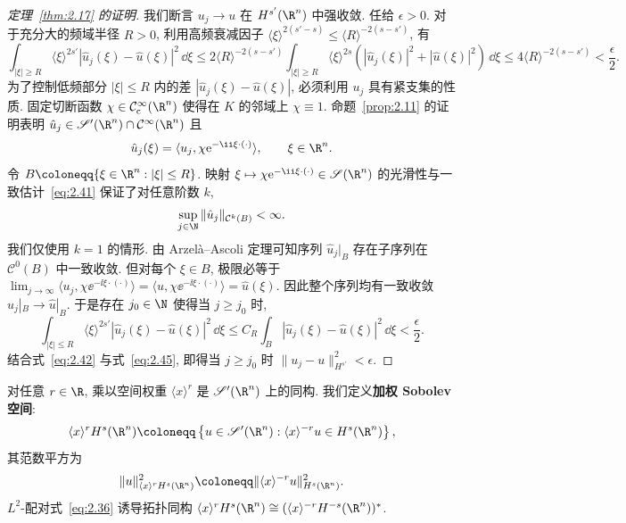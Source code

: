 \begin{proof}[定理~\ref{thm:2.17} 的证明]
我们断言 $u_j \to u$ 在 $H^{s'}(\R^n)$ 中强收敛. 任给 $\epsilon > 0$. 对于充分大的频域半径 $R > 0$, 利用高频衰减因子 $\langle \xi \rangle^{2(s'-s)} \le \langle R \rangle^{-2(s-s')}$, 有
\begin{equation}\label{eq:2.42}
    \int_{|\xi| \ge R} \langle \xi \rangle^{2s'} |\hat{u}_j(\xi) - \hat{u}(\xi)|^2 \,\dd\xi \le 2 \langle R \rangle^{-2(s-s')} \int_{|\xi| \ge R} \langle \xi \rangle^{2s} \left( |\hat{u}_j(\xi)|^2 + |\hat{u}(\xi)|^2 \right) \,\dd\xi \le 4 \langle R \rangle^{-2(s-s')} < \frac{\epsilon}{2}.
\end{equation}
为了控制低频部分 $|\xi| \le R$ 内的差 $|\hat{u}_j(\xi) - \hat{u}(\xi)|$, 必须利用 $u_j$ 具有紧支集的性质. 固定切断函数 $\chi \in \SmoothComp(\R^n)$ 使得在 $K$ 的邻域上 $\chi \equiv 1$. 命题~\ref{prop:2.11} 的证明表明 $\hat{u}_j \in \TempDistr(\R^n) \cap \Smooth(\R^n)$ 且
\begin{equation}\label{eq:2.43}
    \hat{u}_j(\xi) = \langle u_j, \chi \ee^{-\ii \xi \cdot (\cdot)} \rangle, \qquad \xi \in \R^n.
\end{equation}
令 $B \defeq \{\xi \in \R^n : |\xi| \le R\}$. 映射 $\xi \mapsto \chi \ee^{-\ii \xi \cdot (\cdot)} \in \Schwartz(\R^n)$ 的光滑性与一致估计~\eqref{eq:2.41} 保证了对任意阶数 $k$,
\begin{equation}\label{eq:2.44}
    \sup_{j \in \N} \|\hat{u}_j\|_{\mathcal{C}^k(B)} < \infty.
\end{equation}
我们仅使用 $k = 1$ 的情形. 由 Arzelà--Ascoli 定理可知序列 $\hat{u}_j|_B$ 存在子序列在 $\mathcal{C}^0(B)$ 中一致收敛. 但对每个 $\xi \in B$, 极限必等于 $\lim_{j\to\infty} \langle u_j, \chi \ee^{-\ii \xi \cdot (\cdot)} \rangle = \langle u, \chi \ee^{-\ii \xi \cdot (\cdot)} \rangle = \hat{u}(\xi)$. 因此整个序列均有一致收敛 $\hat{u}_j|_B \to \hat{u}|_B$. 于是存在 $j_0 \in \N$ 使得当 $j \ge j_0$ 时,
\begin{equation}\label{eq:2.45}
    \int_{|\xi| \le R} \langle \xi \rangle^{2s'} |\hat{u}_j(\xi) - \hat{u}(\xi)|^2 \,\dd\xi \le C_R \int_B |\hat{u}_j(\xi) - \hat{u}(\xi)|^2 \,\dd\xi < \frac{\epsilon}{2}.
\end{equation}
结合式~\eqref{eq:2.42} 与式~\eqref{eq:2.45}, 即得当 $j \ge j_0$ 时 $\|u_j - u\|_{H^{s'}}^2 < \epsilon$.
\end{proof}

对任意 $r \in \R$, 乘以空间权重 $\langle x \rangle^r$ 是 $\TempDistr(\R^n)$ 上的同构. 我们定义\textbf{加权 Sobolev 空间}:
\begin{equation}\label{eq:2.46}
    \langle x \rangle^r H^s(\R^n) \defeq \left\{ u \in \TempDistr(\R^n) : \langle x \rangle^{-r} u \in H^s(\R^n) \right\},
\end{equation}
其范数平方为
\begin{equation}\label{eq:2.47}
    \|u\|_{\langle x \rangle^r H^s(\R^n)}^2 \defeq \|\langle x \rangle^{-r} u\|_{H^s(\R^n)}^2.
\end{equation}
$L^2$-配对式~\eqref{eq:2.36} 诱导拓扑同构 $\langle x \rangle^r H^s(\R^n) \cong (\langle x \rangle^{-r} H^{-s}(\R^n))^*$.


